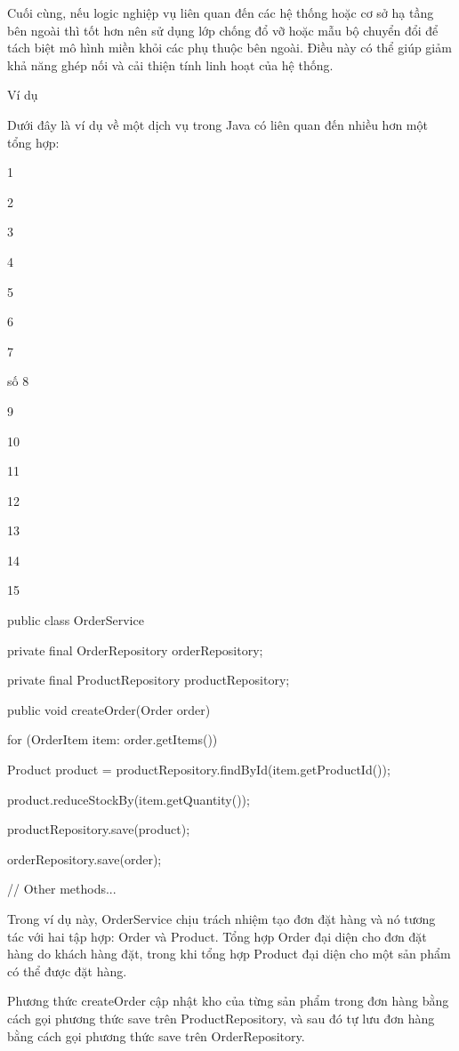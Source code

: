 Cuối cùng, nếu logic nghiệp vụ liên quan đến các hệ thống hoặc cơ sở hạ tầng bên ngoài thì tốt hơn nên sử dụng lớp chống đổ vỡ hoặc mẫu bộ chuyển đổi để tách biệt mô hình miền khỏi các phụ thuộc bên ngoài. Điều này có thể giúp giảm khả năng ghép nối và cải thiện tính linh hoạt của hệ thống.

Ví dụ

Dưới đây là ví dụ về một dịch vụ trong Java có liên quan đến nhiều hơn một tổng hợp:

1

2

3

4

5

6

7

số 8

9

10

11

12

13

14

15

public class OrderService {

        private final OrderRepository orderRepository;

        private final ProductRepository productRepository;

        public void createOrder(Order order) {

                for (OrderItem item: order.getItems()) {

                        Product product = productRepository.findById(item.getProductId());

                        product.reduceStockBy(item.getQuantity());

                        productRepository.save(product);

                    }

                orderRepository.save(order);

            }

        // Other methods...

    }

Trong ví dụ này, OrderService chịu trách nhiệm tạo đơn đặt hàng và nó tương tác với hai tập hợp: Order và Product. Tổng hợp Order đại diện cho đơn đặt hàng do khách hàng đặt, trong khi tổng hợp Product đại diện cho một sản phẩm có thể được đặt hàng.

Phương thức createOrder cập nhật kho của từng sản phẩm trong đơn hàng bằng cách gọi phương thức save trên ProductRepository, và sau đó tự lưu đơn hàng bằng cách gọi phương thức save trên OrderRepository.

